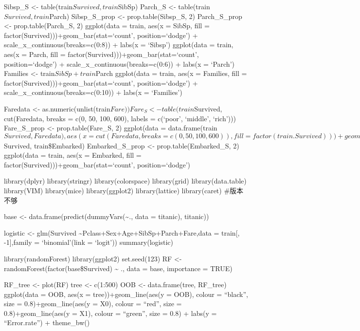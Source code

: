 \documentclass[
]{article}
\begin{document}
Sibsp\_S \textless- table(train\(Survived, train\)SibSp) Parch\_S
\textless- table(train\(Survived, train\)Parch) Sibsp\_S\_prop
\textless- prop.table(Sibsp\_S, 2) Parch\_S\_prop \textless-
prop.table(Parch\_S, 2) ggplot(data = train, aes(x = SibSp, fill =
factor(Survived)))+geom\_bar(stat=`count', position=`dodge') +
scale\_x\_continuous(breaks=c(0:8)) + labs(x = `Sibsp') ggplot(data =
train, aes(x = Parch, fill = factor(Survived)))+geom\_bar(stat=`count',
position=`dodge') + scale\_x\_continuous(breaks=c(0:6)) + labs(x =
`Parch') Families \textless- train\(SibSp +train\)Parch ggplot(data =
train, aes(x = Families, fill =
factor(Survived)))+geom\_bar(stat=`count', position=`dodge') +
scale\_x\_continuous(breaks=c(0:10)) + labs(x = `Families')

Faredata \textless-
as.numeric(unlist(train\(Fare)) Fare_S <- table(train\)Survived,
cut(Faredata, breaks = c(0, 50, 100, 600), labels = c(`poor', `middle',
`rich'))) Fare\_S\_prop \textless- prop.table(Fare\_S, 2) ggplot(data =
data.frame(train\(Survived, Faredata), aes(x = cut(Faredata, breaks = c(0, 50, 100, 600)), fill = factor(train.Survived)))+geom_bar(stat='count', position='dodge') + labs(x = 'Fare') + scale_x_discrete(labels = c('poor', 'middle', 'rich')) Embarked_S <- table(train\)Survived,
train\$Embarked) Embarked\_S\_prop \textless- prop.table(Embarked\_S, 2)
ggplot(data = train, aes(x = Embarked, fill =
factor(Survived)))+geom\_bar(stat=`count', position=`dodge')

library(dplyr) library(stringr) library(colorspace) library(grid)
library(data.table) library(VIM) library(mice) library(ggplot2)
library(lattice) library(caret) \#版本不够

base \textless- data.frame(predict(dummyVars(\textasciitilde., data =
titanic), titanic))

logistic \textless- glm(Survived
\textasciitilde Pclass+Sex+Age+SibSp+Parch+Fare,data = train{[},
-1{]},family = `binomial'(link = `logit')) summary(logistic)

library(randomForest) library(ggplot2) set.seed(123) RF \textless-
randomForest(factor(base\$Survived) \textasciitilde{} ., data = base,
importance = TRUE)

RF\_tree \textless- plot(RF) tree \textless- c(1:500) OOB \textless-
data.frame(tree, RF\_tree) ggplot(data = OOB, aes(x =
tree))+geom\_line(aes(y = OOB), colour = ``black'', size =
0.8)+geom\_line(aes(y = X0), colour = ``red'', size =
0.8)+geom\_line(aes(y = X1), colour = ``green'', size = 0.8) + labs(y =
``Error.rate'') + theme\_bw()
\end{document}
